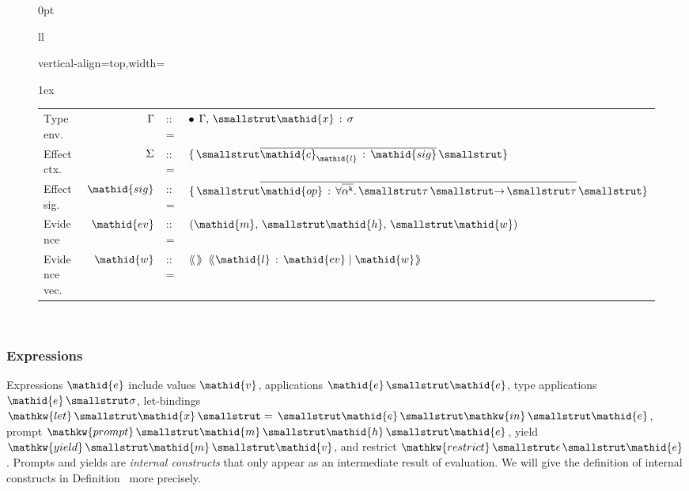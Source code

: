 \documentclass{llncs}
\newcommand\llangle{\langle\kern -0.45ex\langle\kern 0.15ex}
\newcommand\rrangle{\kern 0.15ex\rangle\kern -0.55ex\rangle}
\newcommand{\evec}[1]{\llangle #1\rrangle}
\newcommand{\midbar}{\mid}
\newcommand{\xcolon}{\,:\,}
\begin{document}
\begin{figure}[t]
\begin{mdflushleft}
\begin{mdtabular}{2}{}{0pt}
\begin{tabular}{ll}
\begin{mdcolumn}
\begin{mdblock}{vertical-align=top,width=\dimavailable}
\begin{mdtabular}{4}{}{1ex}
\begin{tabular}{lrll}
Type env.&$\mathpre{\Gamma{}}$&::=&$\mathpre{\bullet{}}$ \hspace*{0.5ex}\textbar{}\hspace*{0.5ex} $\mathpre{\Gamma{},~\mathid{x}\xcolon{}{\sigma}}$\\
Effect ctx.&$\mathpre{\Sigma{}}$&::=&$\mathpre{\{~\overline{{\mathid{c}_\mathid{l}}\xcolon{}\mathid{sig}}~\}}$\\
Effect sig.&$\mathpre{\mathid{sig}}$&::=&$\mathpre{\{~\overline{\mathid{op}\xcolon{}\forall \overline{\alpha{}^{\mathsf{k}}}.~{\tau}~{\rightarrow}~{\tau}}~\}\downstrut}$\\
Evidence&$\mathpre{\mathid{ev}}$&::=&$\mathpre{(\mathid{m},~\mathid{h},~\mathid{w})}$\\
Evidence vec.&$\mathpre{\mathid{w}}$&::=&$\mathpre{\evec{}}$ \textbar{} $\mathpre{{\evec{\mathid{l}\xcolon{}\mathid{ev}\midbar{}\mathid{w}}}}$\\
\end{tabular}\end{mdtabular}%
\end{mdblock}%
\end{mdcolumn}%
\\
\end{tabular}\end{mdtabular}

\mdhr{}%

\noindent{}%
\end{mdflushleft}%
\end{figure}%

\subsubsection{Expressions}%

\noindent Expressions $\mathpre{\mathid{e}}$ include values $\mathpre{\mathid{v}}$, applications $\mathpre{\mathid{e}~\mathid{e}}$, type applications $\mathpre{\mathid{e}~{\sigma}}$, let-bindings $\mathpre{\mathkw{let}~\mathid{x}~=~\mathid{e}~\mathkw{in}~\mathid{e}}$,
prompt $\mathpre{\mathkw{prompt}~\mathid{m}~\mathid{h}~\mathid{e}}$, yield $\mathpre{\mathkw{yield}~\mathid{m}~\mathid{v}}$, and restrict $\mathpre{\mathkw{restrict}~{\epsilon}~\mathid{e}}$.
Prompts and yields are \emph{internal constructs} that only appear as an intermediate result of evaluation.
We will give the definition of internal constructs in Definition~ more precisely.%
\end{document}
